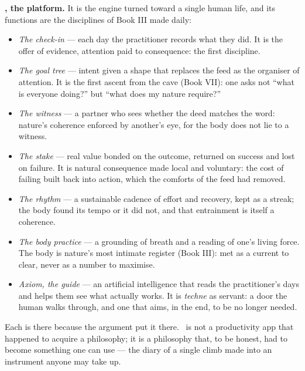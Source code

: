 \textbf{\praxis, the platform.} It is the engine turned toward a single human life,
and its functions are the disciplines of Book III made daily:

\begin{itemize}
\item \emph{The check-in} --- each day the practitioner records what they did. It is
  the offer of evidence, attention paid to consequence: the first discipline.
\item \emph{The goal tree} --- intent given a shape that replaces the feed as the
  organiser of attention. It is the first ascent from the cave (Book VII): one asks
  not ``what is everyone doing?'' but ``what does my nature require?''
\item \emph{The witness} --- a partner who sees whether the deed matches the word:
  nature's coherence enforced by another's eye, for the body does not lie to a
  witness.
\item \emph{The stake} --- real value bonded on the outcome, returned on success and
  lost on failure. It is natural consequence made local and voluntary: the cost of
  failing built back into action, which the comforts of the feed had removed.
\item \emph{The rhythm} --- a sustainable cadence of effort and recovery, kept as a
  streak; the body found its tempo or it did not, and that entrainment is itself a
  coherence.
\item \emph{The body practice} --- a grounding of breath and a reading of one's
  living force. The body is nature's most intimate register (Book III): met as a
  current to clear, never as a number to maximise.
\item \emph{Axiom, the guide} --- an artificial intelligence that reads the
  practitioner's days and helps them see what actually works. It is \emph{techne} as
  servant: a door the human walks through, and one that aims, in the end, to be no
  longer needed.
\end{itemize}

\noindent Each is there because the argument put it there. \praxis\ is not a
productivity app that happened to acquire a philosophy; it is a philosophy that, to
be honest, had to become something one can use --- the diary of a single climb made
into an instrument anyone may take up.
